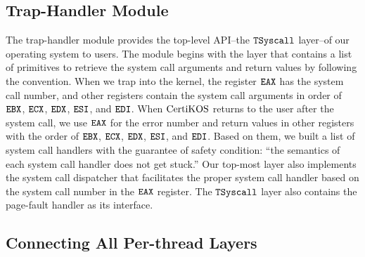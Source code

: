 \subsection{Trap-Handler Module}
\label{chapter:certikos:subsec:trap-handler-module}

The trap-handler module provides the top-level API--the ${{\mathrm{\texttt{TSyscall}}}}$ layer--of our operating system to users.  
The module begins with the layer that contains a list of primitives to retrieve the system call arguments and return values
by following the convention.
When we trap into the kernel, the register ${\mathrm{\texttt{EAX}}}$ has the system call number, and other registers contain the system call arguments in order of ${\mathrm{\texttt{EBX}}}$, ${\mathrm{\texttt{ECX}}}$, ${\mathrm{\texttt{EDX}}}$, ${\mathrm{\texttt{ESI}}}$, and ${\mathrm{\texttt{EDI}}}$. 
When $\mathrm{CertiKOS}$ returns to the user after the system call, we use ${\mathrm{\texttt{EAX}}}$ for the error number and 
return values in other registers with the order of 
 ${\mathrm{\texttt{EBX}}}$, ${\mathrm{\texttt{ECX}}}$, ${\mathrm{\texttt{EDX}}}$, ${\mathrm{\texttt{ESI}}}$, and ${\mathrm{\texttt{EDI}}}$. 
Based on them, 
we built a list of system call handlers with the guarantee of safety condition:
``the semantics of each system call handler does not get stuck.'' 
Our top-most layer also implements the system call dispatcher that facilitates the proper system call handler based on the system call number in the ${\mathrm{\texttt{EAX}}}$ register.
The ${{\mathrm{\texttt{TSyscall}}}}$ layer also contains the page-fault handler as its interface.

\subsection{Connecting All Per-thread Layers}
\label{chapter:certikos:subsec:connecting-all-thread-layers}

